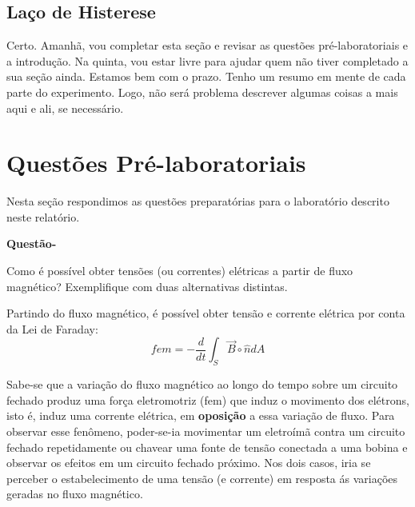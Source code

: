 \documentclass[12pt, a4paper, notitlepage]{article}
\newcounter{counterquestions}
\newenvironment{questions}{
    \noindent
    \stepcounter{counterquestions}
    \textbf{Questão\:\thecounterquestions\:-}
    \noindent
}{
    \noindent
}
\begin{document}

        
        
        
        \subsection{Laço de Histerese}
        
        Certo. Amanhã, vou completar esta seção e revisar as questões pré-laboratoriais e a introdução. Na quinta, vou estar livre para ajudar quem não tiver completado a sua seção ainda. Estamos bem com o prazo. Tenho um resumo em mente de cada parte do experimento. Logo, não será problema descrever algumas coisas a mais aqui e ali, se necessário.
        
        
    \newpage
        
        \section{Questões Pré-laboratoriais}
        
        Nesta seção respondimos as questões preparatórias para o laboratório descrito neste relatório. 
        
        \begin{questions}
            Como é possível obter tensões (ou correntes) elétricas a partir de fluxo magnético? Exemplifique com duas alternativas distintas.
        \end{questions}
            
        Partindo do fluxo magnético, é possível obter tensão e corrente elétrica por conta da Lei de Faraday:
        \begin{equation}
            fem = -\frac{d}{dt}\int_{S}\vec{B}\circ\hat{n}dA 
        \end{equation}
        
        Sabe-se que a variação do fluxo magnético ao longo do tempo sobre um circuito fechado produz uma força eletromotriz (fem) que induz o movimento dos elétrons, isto é, induz uma corrente elétrica, em \textbf{oposição} a essa variação de fluxo. Para observar esse fenômeno, poder-se-ia movimentar um eletroímã contra um circuito fechado repetidamente ou chavear uma fonte de tensão conectada a uma bobina e observar os efeitos em um circuito fechado próximo. Nos dois casos, iria se perceber o estabelecimento de uma tensão (e corrente) em resposta ás variações geradas no fluxo magnético. 
        
\end{document}
